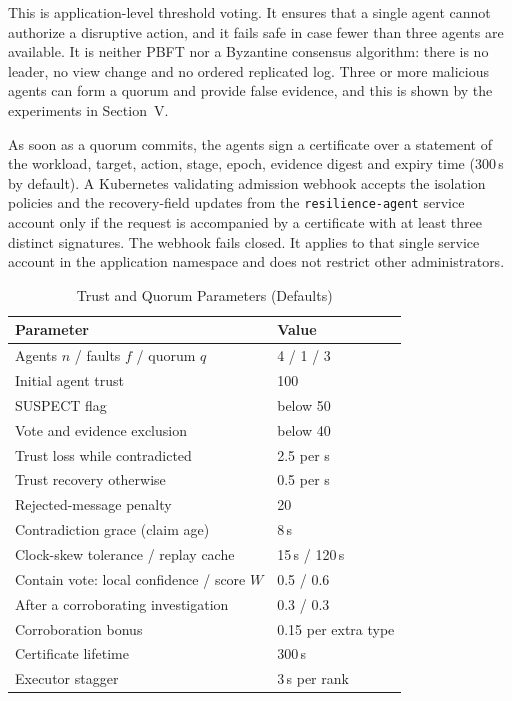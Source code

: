 \documentclass[journal]{IEEEtran}
\begin{document}
This is application-level threshold voting. It ensures that a single agent cannot authorize a disruptive action, and it fails safe in case fewer than three agents are available. It is neither PBFT nor a Byzantine consensus algorithm: there is no leader, no view change and no ordered replicated log. Three or more malicious agents can form a quorum and provide false evidence, and this is shown by the experiments in Section~V.

As soon as a quorum commits, the agents sign a certificate over a statement of the workload, target, action, stage, epoch, evidence digest and expiry time (300\,s by default). A Kubernetes validating admission webhook accepts the isolation policies and the recovery-field updates from the \texttt{resilience-agent} service account only if the request is accompanied by a certificate with at least three distinct signatures. The webhook fails closed. It applies to that single service account in the application namespace and does not restrict other administrators.

\begin{table}[!t]
\caption{Trust and Quorum Parameters (Defaults)}
\label{tab:trustq}
\centering\small
\begin{tabularx}{\columnwidth}{@{}Y l@{}}
\toprule
Parameter & Value \\
\midrule
Agents $n$ / faults $f$ / quorum $q$ & 4 / 1 / 3 \\
Initial agent trust & 100 \\
SUSPECT flag & below 50 \\
Vote and evidence exclusion & below 40 \\
Trust loss while contradicted & 2.5 per s \\
Trust recovery otherwise & 0.5 per s \\
Rejected-message penalty & 20 \\
Contradiction grace (claim age) & 8\,s \\
Clock-skew tolerance / replay cache & 15\,s / 120\,s \\
Contain vote: local confidence / score $W$ & 0.5 / 0.6 \\
After a corroborating investigation & 0.3 / 0.3 \\
Corroboration bonus & 0.15 per extra type \\
Certificate lifetime & 300\,s \\
Executor stagger & 3\,s per rank \\
\bottomrule
\end{tabularx}
\end{table}
\end{document}
